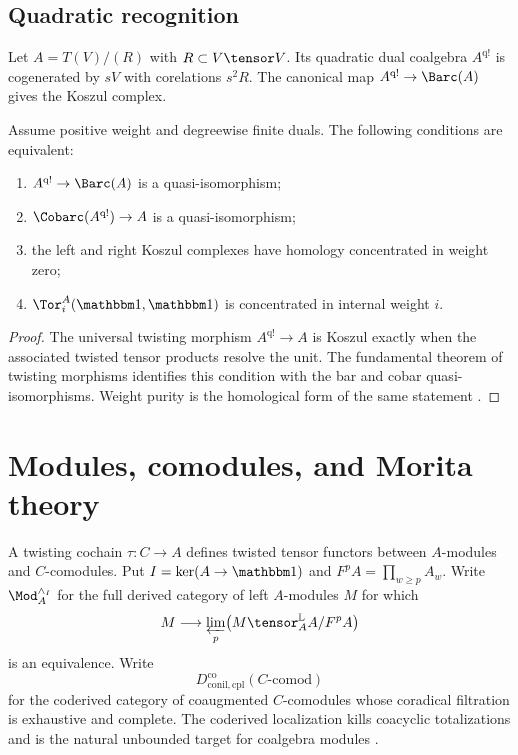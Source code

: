 \section{Quadratic recognition}
Let $A=T(V)/(R)$ with $R\subset V\tensor V$. Its quadratic dual coalgebra $A^{\mathrm{q!}}$ is cogenerated by $sV$ with corelations $s^2R$. The canonical map $A^{\mathrm{q!}}\to\Barc(A)$ gives the Koszul complex.

\begin{theorem}
Assume positive weight and degreewise finite duals. The following conditions are equivalent:
\begin{enumerate}
\item $A^{\mathrm{q!}}\to\Barc(A)$ is a quasi-isomorphism;
\item $\Cobarc(A^{\mathrm{q!}})\to A$ is a quasi-isomorphism;
\item the left and right Koszul complexes have homology concentrated in weight zero;
\item $\Tor_i^A(\mathbbm1,\mathbbm1)$ is concentrated in internal weight $i$.
\end{enumerate}
\end{theorem}
\begin{proof}
The universal twisting morphism $A^{\mathrm{q!}}\to A$ is Koszul exactly when the associated twisted tensor products resolve the unit. The fundamental theorem of twisting morphisms identifies this condition with the bar and cobar quasi-isomorphisms. Weight purity is the homological form of the same statement \cite{Priddy,LV}.
\end{proof}

\chapter{Modules, comodules, and Morita theory}
A twisting cochain $\tau:C\to A$ defines twisted tensor functors between $A$-modules and $C$-comodules. Put $I=\ker(A\to\mathbbm1)$ and $F^pA=\prod_{w\ge p}A_w$. Write $\Mod_A^{\wedge_I}$ for the full derived category of left $A$-modules $M$ for which
\[
 M\longrightarrow\varprojlim_p\bigl(M\tensor_A^{\mathbb L}A/F^pA\bigr)
\]
is an equivalence. Write
\[
 D^{\mathrm{co}}_{\mathrm{conil,cpl}}(C\text{-}\mathrm{comod})
\]
for the coderived category of coaugmented $C$-comodules whose coradical filtration is exhaustive and complete. The coderived localization kills coacyclic totalizations and is the natural unbounded target for coalgebra modules \cite{Positselski}.

